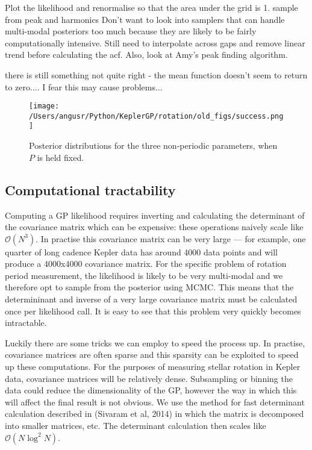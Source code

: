 \documentclass[10pt,preprint]{aastex}
\begin{document}
Plot the likelihood and renormalise so that the area under the grid is 1.
sample from peak and harmonics
Don't want to look into samplers that can handle multi-modal posteriors too much because they are likely to be fairly computationally intensive.
Still need to interpolate across gaps and remove linear trend before calculating the acf.
Also, look at Amy's peak finding algorithm.

there is still something not quite right - the mean function doesn't seem to return to zero.... I fear this may cause problems...

\begin{figure}[ht]
\begin{center}
\texttt{[image: /Users/angusr/Python/KeplerGP/rotation/old\_figs/success.png]}
\caption{Posterior distributions for the three non-periodic parameters, when $P$ is held fixed.}
\label{fig:fixed_period}
\end{center}
\end{figure}

\subsection{Computational tractability}

Computing a GP likelihood requires inverting and calculating the determinant of the covariance matrix which can be expensive:
these operations naively scale like $\mathcal{O}(N^3)$.
In practise this covariance matrix can be very large --- for example, one quarter of long cadence Kepler data has around 4000 data points and will produce a 4000x4000 covariance matrix.
For the specific problem of rotation period measurement, the likelihood is likely to be very multi-modal and we therefore opt to sample from the posterior using MCMC.
This means that the determininant and inverse of a very large covariance matrix must be calculated once per likelihood call.
It is easy to see that this problem very quickly becomes intractable.

Luckily there are some tricks we can employ to speed the process up. %
In practise, covariance matrices are often sparse and this sparsity can be exploited to speed up these computations.
For the purposes of measuring stellar rotation in Kepler data, covariance matrices will be relatively dense.
Subsampling or binning the data could reduce the dimensionality of the GP, however the way in which this will affect the final result is not obvious.
We use the method for fast determinant calculation described in (Sivaram et al, 2014) in which the matrix is decomposed into smaller matrices, etc.
The determinant calculation then scales like $\mathcal{O}(N\log^2{N})$.
\end{document}
